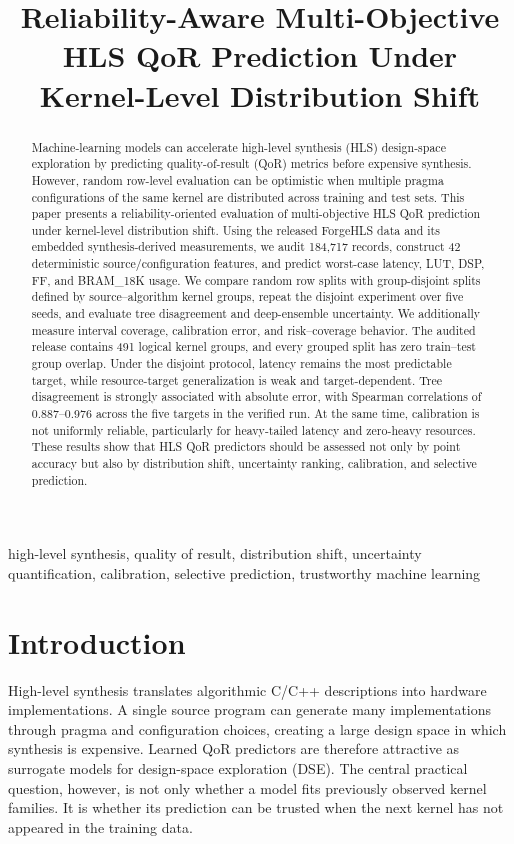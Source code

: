 \documentclass[conference]{IEEEtran}
\title{Reliability-Aware Multi-Objective HLS QoR Prediction Under Kernel-Level Distribution Shift}
\author{
\IEEEauthorblockN{AUTHOR NAME(S)}
\IEEEauthorblockA{
Department or Laboratory\\
University or Organization\\
City, Country\\
email@example.com}
}
\begin{document}
\maketitle

\begin{abstract}
Machine-learning models can accelerate high-level synthesis (HLS) design-space exploration by predicting quality-of-result (QoR) metrics before expensive synthesis. However, random row-level evaluation can be optimistic when multiple pragma configurations of the same kernel are distributed across training and test sets. This paper presents a reliability-oriented evaluation of multi-objective HLS QoR prediction under kernel-level distribution shift. Using the released ForgeHLS data and its embedded synthesis-derived measurements, we audit 184,717 records, construct 42 deterministic source/configuration features, and predict worst-case latency, LUT, DSP, FF, and BRAM\_18K usage. We compare random row splits with group-disjoint splits defined by source--algorithm kernel groups, repeat the disjoint experiment over five seeds, and evaluate tree disagreement and deep-ensemble uncertainty. We additionally measure interval coverage, calibration error, and risk--coverage behavior. The audited release contains 491 logical kernel groups, and every grouped split has zero train--test group overlap. Under the disjoint protocol, latency remains the most predictable target, while resource-target generalization is weak and target-dependent. Tree disagreement is strongly associated with absolute error, with Spearman correlations of 0.887--0.976 across the five targets in the verified run. At the same time, calibration is not uniformly reliable, particularly for heavy-tailed latency and zero-heavy resources. These results show that HLS QoR predictors should be assessed not only by point accuracy but also by distribution shift, uncertainty ranking, calibration, and selective prediction.
\end{abstract}

\begin{IEEEkeywords}
high-level synthesis, quality of result, distribution shift, uncertainty quantification, calibration, selective prediction, trustworthy machine learning
\end{IEEEkeywords}

\section{Introduction}
High-level synthesis translates algorithmic C/C++ descriptions into hardware implementations. A single source program can generate many implementations through pragma and configuration choices, creating a large design space in which synthesis is expensive. Learned QoR predictors are therefore attractive as surrogate models for design-space exploration (DSE). The central practical question, however, is not only whether a model fits previously observed kernel families. It is whether its prediction can be trusted when the next kernel has not appeared in the training data.
\end{document}
